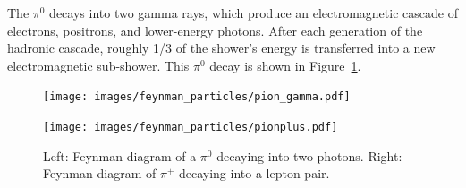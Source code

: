   
  The $\pi^0$ decays into two gamma rays, which produce an electromagnetic cascade of electrons, positrons, and lower-energy photons.
  After each generation of the hadronic cascade, roughly 1/3 of the shower's energy is transferred into a new electromagnetic sub-shower.
  This $\pi^{0}$ decay is shown in Figure~\ref{fig:feynman_pi}.
  
  \begin{figure}[tb]
    \centering
    \hfill
    \begin{minipage}{0.45\textwidth}\texttt{[image: images/feynman\_particles/pion\_gamma.pdf]}\end{minipage}\hfill
    \begin{minipage}{0.45\textwidth}\texttt{[image: images/feynman\_particles/pionplus.pdf]}  \end{minipage}\hfill
    \hfill\hfill
    \caption[Feynman Diagrams of Pions]{
      Left: Feynman diagram of a $\pi^{0}$ decaying into two photons.
      Right: Feynman diagram of $\pi^{+}$ decaying into a lepton pair.
      \CaptionBlankLine
    }
    \label{fig:feynman_pi}
  \end{figure}
      


  
